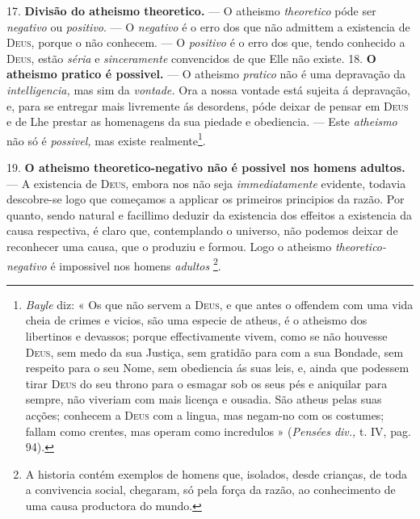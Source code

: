17. \textbf{Divisão do atheismo theoretico.} --- O atheismo \emph{theoretico} póde ser \emph{negativo} ou \emph{positivo}. --- O \emph{negativo} é o erro dos que não admittem a existencia de \textsc{Deus}, porque o não conhecem. --- O \emph{positivo} é o erro dos que, tendo conhecido a \textsc{Deus}, estão \emph{séria} e \emph{sinceramente} convencidos de que Elle não existe.
 18. \textbf{O atheismo pratico é possivel.} --- O atheismo \emph{pratico} não é uma depravação da \emph{intelligencia,} mas sim da \emph{vontade.} Ora a nossa vontade está sujeita á depravação, e, para se entregar mais livremente ás desordens, póde deixar de pensar em \textsc{Deus} e de Lhe prestar as homenagens da sua piedade e obediencia. --- Este \emph{atheismo} não só é \emph{possivel,} mas existe realmente\footnote{\emph{Bayle} diz: « Os que não servem a \textsc{Deus}, e que antes o offendem com uma vida cheia de crimes e vicios, são uma especie de atheus, é o atheismo dos libertinos e devassos; porque effectivamente vivem, como se não houvesse \textsc{Deus}, sem medo da sua Justiça, sem gratidão para com a sua Bondade, sem respeito para o seu Nome, sem obediencia ás suas leis, e, ainda que podessem tirar \textsc{Deus} do seu throno para o esmagar sob os seus pés e aniquilar para sempre, não viveriam com mais licença e ousadia. São atheus pelas suas acções; conhecem a \textsc{Deus} com a lingua, mas negam-no com os costumes; fallam como crentes, mas operam como incredulos » (\emph{Pensées div.,} t. IV, pag. 94).}.

19. \textbf{O atheismo theoretico-negativo não é possivel nos homens adultos.} --- A existencia de \textsc{Deus}, embora nos não seja \emph{immediatamente} evidente, todavia descobre-se logo que começamos a applicar os primeiros principios da razão. Por quanto, sendo natural e facillimo deduzir da existencia dos effeitos a existencia da causa respectiva, é claro que, contemplando o universo, não podemos deixar de reconhecer uma causa, que o produziu e formou. Logo o atheismo \emph{theoretico-negativo} é impossivel nos homens \emph{adultos} \footnote{A historia contém exemplos de homens que, isolados, desde crianças, de toda a convivencia social, chegaram, só pela força da razão, ao conhecimento de uma causa productora do mundo.}.

